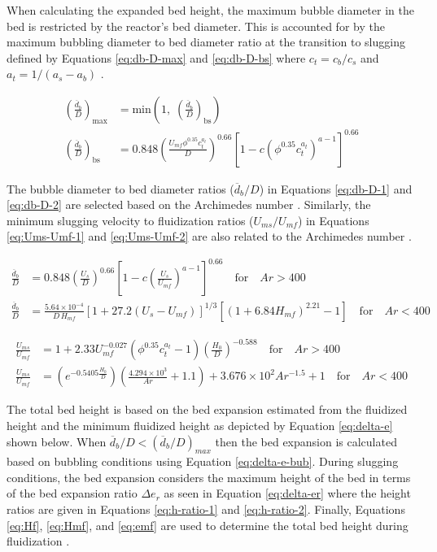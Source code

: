 \documentclass[12pt,titlepage]{article}
\begin{document}
When calculating the expanded bed height, the maximum bubble diameter in the bed is restricted by the reactor's bed diameter. This is accounted for by the maximum bubbling diameter to bed diameter ratio at the transition to slugging defined by Equations \ref{eq:db-D-max} and \ref{eq:db-D-bs} where $c_t = c_b / c_s$ and $a_t = 1 / (a_s - a_b)$ \cite{Agu-2019g}.

\begin{align}
    \left( \frac{\overline{d}_b}{D} \right)_\text{max} &= \text{min} \left(1,\; \left( \frac{\overline{d}_b}{D} \right)_\text{bs} \right) \label{eq:db-D-max} \\
    \left( \frac{\overline{d}_b}{D} \right)_\text{bs} &= 0.848 \left( \frac{U_{mf} \phi^{0.35} c_t^{a_t}}{D} \right)^{0.66} \left[ 1 - c (\phi^{0.35} c_t^{a_t})^{a-1} \right]^{0.66} \label{eq:db-D-bs}
\end{align}

The bubble diameter to bed diameter ratios ($\overline{d}_b/D$) in Equations \ref{eq:db-D-1} and \ref{eq:db-D-2} are selected based on the Archimedes number \cite{Agu-2019a, Werther-1974}. Similarly, the minimum slugging velocity to fluidization ratios ($U_{ms}/U_{mf}$) in Equations \ref{eq:Ums-Umf-1} and \ref{eq:Ums-Umf-2} are also related to the Archimedes number \cite{Agu-2018, Shaul-2012}.

\begin{align}
    \frac{\overline{d}_b}{D} &= 0.848 \left(\frac{U_s}{D} \right)^{0.66} \left[1 - c \left(\frac{U_s}{U_{mf}} \right)^{a - 1} \right]^{0.66} \quad \text{for}\quad Ar > 400 \label{eq:db-D-1} \\
    \frac{\overline{d}_b}{D} &= \frac{5.64\times10^{-4}}{D\,H_{mf}} \left[1 + 27.2 (U_s - U_{mf}) \right]^{1/3} \left[(1 + 6.84 H_{mf})^{2.21} - 1 \right] \quad \text{for}\quad Ar < 400 \label{eq:db-D-2}
\end{align}

\begin{align}
    \frac{U_{ms}}{U_{mf}} &= 1 + 2.33 U_{mf}^{-0.027} \left(\phi^{0.35} c_t^{a_t}-1 \right) \left(\frac{H_0}{D} \right)^{-0.588} \quad \text{for}\quad Ar > 400 \label{eq:Ums-Umf-1} \\
    \frac{U_{ms}}{U_{mf}} &= \left(e^{-0.5405 \frac{H_0}{D}} \right) \left(\frac{4.294\times10^3}{Ar} + 1.1 \right) + 3.676\times10^2 Ar^{-1.5} + 1 \quad \text{for}\quad Ar < 400 \label{eq:Ums-Umf-2}
\end{align}

The total bed height is based on the bed expansion estimated from the fluidized height and the minimum fluidized height as depicted by Equation \ref{eq:delta-e} shown below. When $\overline{d}_b/D < (\overline{d}_b/D)_{max}$ then the bed expansion is calculated based on bubbling conditions using Equation \ref{eq:delta-e-bub}. During slugging conditions, the bed expansion considers the maximum height of the bed in terms of the bed expansion ratio $\Delta e_r$ as seen in Equation \ref{eq:delta-er} where the height ratios are given in Equations \ref{eq:h-ratio-1} and \ref{eq:h-ratio-2}. Finally, Equations \ref{eq:Hf}, \ref{eq:Hmf}, and \ref{eq:emf} are used to determine the total bed height during fluidization \cite{Agu-2019b, Agu-2019f, Agu-2019g, Wen-1966}.
\end{document}
